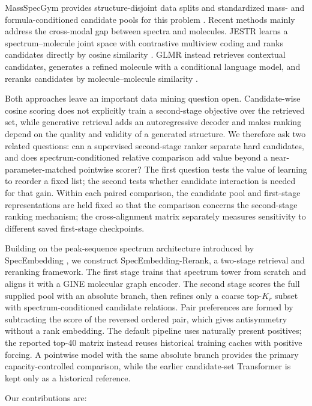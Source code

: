 \documentclass[runningheads]{llncs}
\newcommand{\method}{SpecEmbedding-Rerank}
\begin{document}
MassSpecGym provides structure-disjoint data splits and standardized
mass- and formula-conditioned candidate pools for this problem
\cite{bushuiev2024massspecgym}. Recent methods mainly address the cross-modal
gap between spectra and molecules. JESTR learns a spectrum--molecule joint space
with contrastive multiview coding and ranks candidates directly by cosine
similarity \cite{kalia2025jestr,tian2020cmc}. GLMR instead retrieves contextual
candidates, generates a refined molecule with a conditional language model, and
reranks candidates by molecule--molecule similarity \cite{zhang2026glmr}.

Both approaches leave an important data mining question open. Candidate-wise
cosine scoring does not explicitly train a second-stage objective over the
retrieved set, while generative retrieval adds an autoregressive decoder and
makes ranking depend on the quality and validity of a generated structure. We
therefore ask two related questions: can a supervised second-stage ranker
separate hard candidates, and does spectrum-conditioned relative comparison
add value beyond a near-parameter-matched pointwise scorer? The first question tests
the value of learning to reorder a fixed list; the second tests whether
candidate interaction is needed for that gain. Within each paired comparison,
the candidate pool and first-stage representations are held fixed so that the
comparison concerns the second-stage ranking mechanism; the cross-alignment
matrix separately measures sensitivity to different saved first-stage
checkpoints.

Building on the peak-sequence spectrum architecture introduced by SpecEmbedding
\cite{xiong2025specembedding}, we construct \method{}, a two-stage retrieval and
reranking framework. The first stage trains that spectrum tower from scratch and
aligns it with a GINE molecular graph encoder. The second stage scores the full
supplied pool with an absolute branch, then refines only a coarse top-$K_r$
subset with spectrum-conditioned candidate relations. Pair preferences are
formed by subtracting the score of the reversed ordered pair, which gives
antisymmetry without a rank embedding. The default pipeline uses naturally
present positives; the reported top-40 matrix instead reuses historical
training caches with positive forcing. A pointwise model with the same absolute branch provides the primary
capacity-controlled comparison, while the earlier candidate-set Transformer is
kept only as a historical reference.

Our contributions are:
\end{document}
